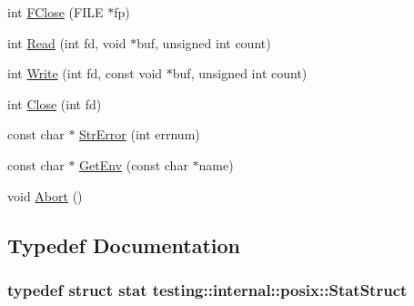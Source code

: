 \begin{DoxyCompactItemize}
\item 
int \hyperlink{namespacetesting_1_1internal_1_1posix_af4beeaaa8d62916d5e3b644a1ddfbd6b}{F\+Close} (F\+I\+L\+E $\ast$fp)
\item 
int \hyperlink{namespacetesting_1_1internal_1_1posix_a3c6ab13e581a56f1b02f3eb7536c97fd}{Read} (int fd, void $\ast$buf, unsigned int count)
\item 
int \hyperlink{namespacetesting_1_1internal_1_1posix_af4acf9f78d55f815a18b43786511abef}{Write} (int fd, const void $\ast$buf, unsigned int count)
\item 
int \hyperlink{namespacetesting_1_1internal_1_1posix_a15e5b8f2a535ef1b2529b85b861e4846}{Close} (int fd)
\item 
const char $\ast$ \hyperlink{namespacetesting_1_1internal_1_1posix_a4b77b14af6f4d18f83d303b98e9349c4}{Str\+Error} (int errnum)
\item 
const char $\ast$ \hyperlink{namespacetesting_1_1internal_1_1posix_a1d5e3da5a27eed25986859fa83cafe95}{Get\+Env} (const char $\ast$name)
\item 
void \hyperlink{namespacetesting_1_1internal_1_1posix_a69b8278c59359dd6a6f941b4643db9fb}{Abort} ()
\end{DoxyCompactItemize}


\subsection{Typedef Documentation}
\hypertarget{namespacetesting_1_1internal_1_1posix_a8eb9f08d3af29941c2d2a964cfff3ecb}{
\subsubsection[{Stat\+Struct}]{\setlength{\rightskip}{0pt plus 5cm}typedef struct stat {\bf testing\+::internal\+::posix\+::\+Stat\+Struct}}}\label{namespacetesting_1_1internal_1_1posix_a8eb9f08d3af29941c2d2a964cfff3ecb}


